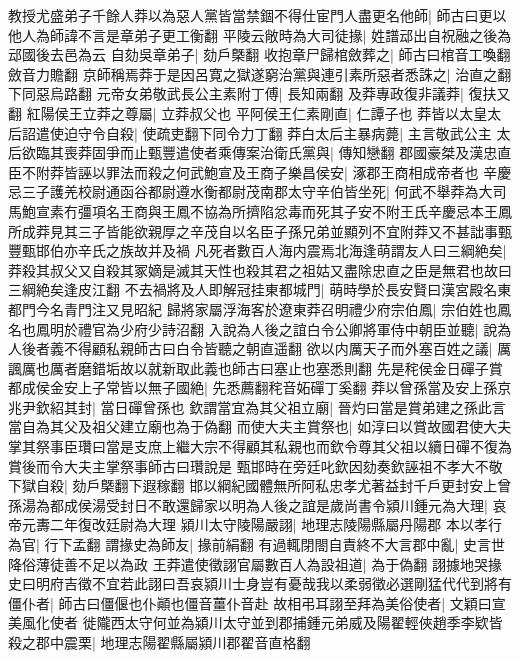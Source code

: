 教授尤盛弟子千餘人莽以為惡人黨皆當禁錮不得仕宦門人盡更名他師|{
	師古曰更以他人為師諱不言是章弟子更工衡翻}
平陵云敞時為大司徒掾|{
	姓譜䢵出自祝融之後為䢵國後去邑為云}
自劾吳章弟子|{
	劾戶槩翻}
收抱章尸歸棺斂葬之|{
	師古曰棺音工喚翻斂音力贍翻}
京師稱焉莽于是因呂寛之獄遂窮治黨與連引素所惡者悉誅之|{
	治直之翻下同惡烏路翻}
元帝女弟敬武長公主素附丁傅|{
	長知兩翻}
及莽專政復非議莽|{
	復扶又翻}
紅陽侯王立莽之尊屬|{
	立莽叔父也}
平阿侯王仁素剛直|{
	仁譚子也}
莽皆以太皇太后詔遣使迫守令自殺|{
	使疏吏翻下同令力丁翻}
莽白太后主暴病薨|{
	主言敬武公主}
太后欲臨其喪莽固爭而止甄豐遣使者乘傳案治衛氏黨與|{
	傳知戀翻}
郡國豪桀及漢忠直臣不附莽皆誣以罪法而殺之何武鮑宣及王商子樂昌侯安|{
	涿郡王商相成帝者也}
辛慶忌三子護羌校尉通函谷都尉遵水衡都尉茂南郡太守辛伯皆坐死|{
	何武不舉莽為大司馬鮑宣素冇彊項名王商與王鳳不協為所擠陷忿毒而死其子安不附王氏辛慶忌本王鳳所成莽見其三子皆能欲親厚之辛茂自以名臣子孫兄弟並顯列不宜附莽又不甚詘事甄豐甄邯伯亦辛氏之族故并及禍}
凡死者數百人海内震焉北海逢萌謂友人曰三綱絶矣|{
	莽殺其叔父又自殺其冢嫡是滅其天性也殺其君之祖姑又盡除忠直之臣是無君也故曰三綱絶矣逢皮江翻}
不去禍將及人即解冠挂東都城門|{
	萌時學於長安賢曰漢宮殿名東都門今名青門注又見昭紀}
歸將家屬浮海客於遼東莽召明禮少府宗伯鳳|{
	宗伯姓也鳳名也鳳明於禮官為少府少詩沼翻}
入說為人後之誼白令公卿將軍侍中朝臣並聽|{
	說為人後者義不得顧私親師古曰白令皆聽之朝直遥翻}
欲以内厲天子而外塞百姓之議|{
	厲諷厲也厲者磨錯垢故以就新取此義也師古曰塞止也塞悉則翻}
先是秺侯金日磾子賞都成侯金安上子常皆以無子國絶|{
	先悉薦翻秺音妬磾丁奚翻}
莽以曾孫當及安上孫京兆尹欽紹其封|{
	當日磾曾孫也}
欽謂當宜為其父祖立廟|{
	晉灼曰當是賞弟建之孫此言當自為其父及祖父建立廟也為于偽翻}
而使大夫主賞祭也|{
	如淳曰以賞故國君使大夫掌其祭事臣瓚曰當是支庶上繼大宗不得顧其私親也而欽令尊其父祖以續日磾不復為賞後而令大夫主掌祭事師古曰瓚說是}
甄邯時在旁廷叱欽因劾奏欽誣祖不孝大不敬下獄自殺|{
	劾戶槩翻下遐稼翻}
邯以綱紀國體無所阿私忠孝尤著益封千戶更封安上曾孫湯為都成侯湯受封日不敢還歸家以明為人後之誼是歲尚書令潁川鍾元為大理|{
	哀帝元夀二年復改廷尉為大理}
潁川太守陵陽嚴詡|{
	地理志陵陽縣屬丹陽郡}
本以孝行為官|{
	行下孟翻}
謂掾史為師友|{
	掾前絹翻}
有過輒閉閤自責終不大言郡中亂|{
	史言世降俗薄徒善不足以為政}
王莽遣使徵詡官屬數百人為設祖道|{
	為于偽翻}
詡據地哭掾史曰明府吉徵不宜若此詡曰吾哀潁川士身豈有憂哉我以柔弱徵必選剛猛代代到將有僵仆者|{
	師古曰僵偃也仆顚也僵音薑仆音赴}
故相弔耳詡至拜為美俗使者|{
	文穎曰宣美風化使者}
徙隴西太守何並為潁川太守並到郡捕鍾元弟威及陽翟輕俠趙季李欵皆殺之郡中震栗|{
	地理志陽翟縣屬潁川郡翟音直格翻}


